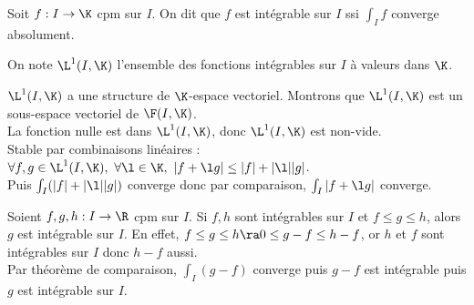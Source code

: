 \documentclass[11pt]{article}
\begin{document}
\begin{defi}{}{}
    Soit $f:I\to\K$ cpm sur $I$. On dit que $f$ est intégrable sur $I$ ssi $\int_I f$ converge absolument.
\end{defi}

\begin{nota}{}{}
    On note $\L^1(I,\K)$ l'ensemble des fonctions intégrables sur $I$ à valeurs dans $\K$.
\end{nota}

\begin{prop}{}{}
    $\L^1(I,\K)$ a une structure de $\K$-espace vectoriel.
    \tcblower
    Montrons que $\L^1(I,\K)$ est un sous-espace vectoriel de $\F(I,\K)$.\\
    La fonction nulle est dans $\L^1(I,\K)$, donc $\L^1(I,\K)$ est non-vide.\\
    Stable par combinaisons linéaires : $\forall f,g\in\L^1(I,\K), ~ \forall \l \in \K, ~ |f+\l g| \leq |f| + |\l||g|$.\\
    Puis $\int_I(|f|+|\l||g|)$ converge donc par comparaison, $\int_I|f+\l g|$ converge.
\end{prop}

\begin{ex}{}{}
    Soient $f,g,h:I\to\R$ cpm sur $I$. Si $f,h$ sont intégrables sur $I$ et $f\leq g\leq h$, alors $g$ est intégrable sur $I$.
    \tcblower
    En effet, $f \leq g \leq h \ra 0 \leq g-f \leq h-f$, or $h$ et $f$ sont intégrables sur $I$ donc $h-f$ aussi.\\
    Par théorème de comparaison, $\int_I (g-f)$ converge puis $g-f$ est intégrable puis $g$ est intégrable sur $I$.
\end{ex}
\end{document}

